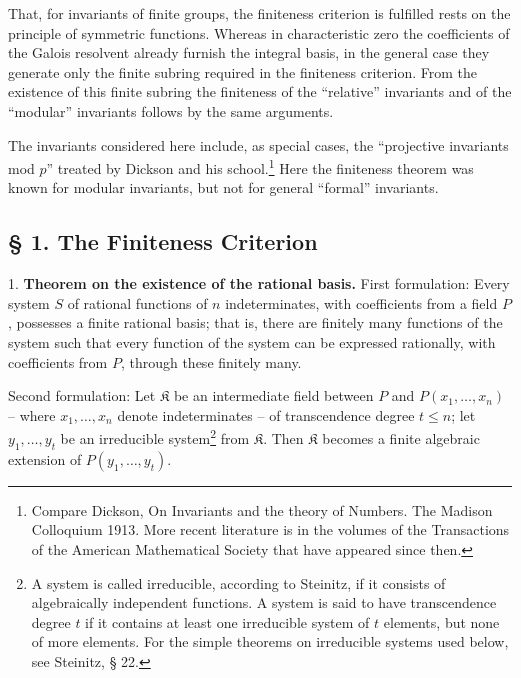 That, for invariants of finite groups, the finiteness criterion is fulfilled rests on the principle of symmetric functions. Whereas in characteristic zero the coefficients of the Galois resolvent already furnish the integral basis, in the general case they generate only the finite subring required in the finiteness criterion. From the existence of this finite subring the finiteness of the ``relative'' invariants and of the ``modular'' invariants follows by the same arguments.

The invariants considered here include, as special cases, the ``projective invariants mod $p$'' treated by Dickson and his school.\footnote{Compare Dickson, On Invariants and the theory of Numbers. The Madison Colloquium 1913. More recent literature is in the volumes of the Transactions of the American Mathematical Society that have appeared since then.} Here the finiteness theorem was known for modular invariants, but not for general ``formal'' invariants.

\subsection*{§ 1. The Finiteness Criterion}

1. \textbf{Theorem on the existence of the rational basis.} First formulation: Every system $S$ of rational functions of $n$ indeterminates, with coefficients from a field $P$, possesses a finite rational basis; that is, there are finitely many functions of the system such that every function of the system can be expressed rationally, with coefficients from $P$, through these finitely many.

Second formulation: Let $\mathfrak K$ be an intermediate field between $P$ and $P(x_1,\ldots,x_n)$ -- where $x_1,\ldots,x_n$ denote indeterminates -- of transcendence degree $t\leq n$; let $y_1,\ldots,y_t$ be an irreducible system\footnote{A system is called irreducible, according to Steinitz, if it consists of algebraically independent functions. A system is said to have transcendence degree $t$ if it contains at least one irreducible system of $t$ elements, but none of more elements. For the simple theorems on irreducible systems used below, see Steinitz, § 22.} from $\mathfrak K$. Then $\mathfrak K$ becomes a finite algebraic extension of $P(y_1,\ldots,y_t)$.

